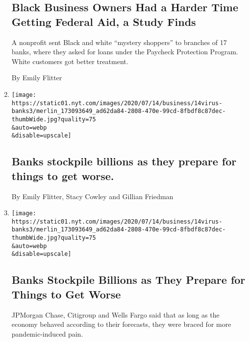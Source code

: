 \begin{enumerate}
  \hypertarget{black-business-owners-had-a-harder-time-getting-federal-aid-a-study-finds-1}{%
  \subsection{Black Business Owners Had a Harder Time Getting Federal
  Aid, a Study
  Finds}\label{black-business-owners-had-a-harder-time-getting-federal-aid-a-study-finds-1}}

  A nonprofit sent Black and white ``mystery shoppers'' to branches of
  17 banks, where they asked for loans under the Paycheck Protection
  Program. White customers got better treatment.

  By Emily Flitter
\item
  \href{/live/2020/07/14/business/stock-market-updates-coronavirus/banks-stockpile-billions-as-they-prepare-for-things-to-get-worse}{}

  \texttt{[image: https://static01.nyt.com/images/2020/07/14/business/14virus-banks3/merlin\_173093649\_ad62da84-2808-470e-99cd-8fbdf8c87dec-thumbWide.jpg?quality=75\\\&auto=webp\\\&disable=upscale]}

  \hypertarget{banks-stockpile-billions-as-they-prepare-for-things-to-get-worse}{%
  \subsection{Banks stockpile billions as they prepare for things to get
  worse.}\label{banks-stockpile-billions-as-they-prepare-for-things-to-get-worse}}

  By Emily Flitter, Stacy Cowley and Gillian Friedman
\item
  \href{/2020/07/14/business/big-banks-quarterly-results.html}{}

  \texttt{[image: https://static01.nyt.com/images/2020/07/14/business/14virus-banks3/merlin\_173093649\_ad62da84-2808-470e-99cd-8fbdf8c87dec-thumbWide.jpg?quality=75\\\&auto=webp\\\&disable=upscale]}

  \hypertarget{banks-stockpile-billions-as-they-prepare-for-things-to-get-worse-1}{%
  \subsection{Banks Stockpile Billions as They Prepare for Things to Get
  Worse}\label{banks-stockpile-billions-as-they-prepare-for-things-to-get-worse-1}}

  JPMorgan Chase, Citigroup and Wells Fargo said that as long as the
  economy behaved according to their forecasts, they were braced for
  more pandemic-induced pain.


\end{enumerate}
